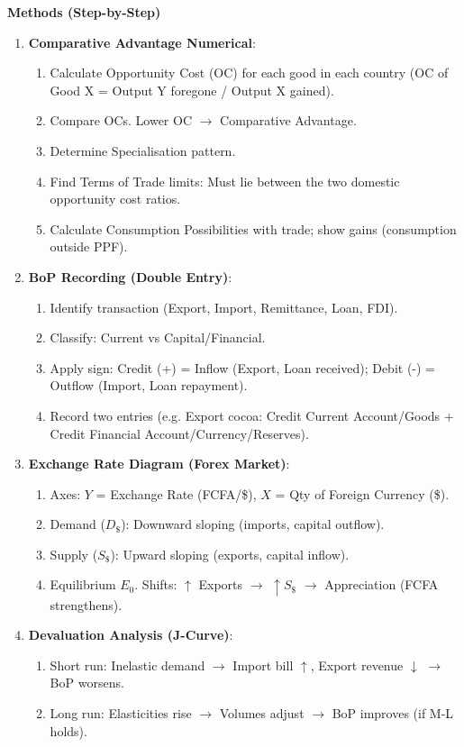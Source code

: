 \documentclass[11pt]{article}
\newcommand{\cle}[1]{{\popxbold\color{popdark}#1}}
\begin{document}
\begin{bilan}
\textbf{Methods (Step-by-Step)}
\begin{enumerate}
    \item \textbf{Comparative Advantage Numerical}: 
    \begin{enumerate}
        \item Calculate Opportunity Cost (OC) for each good in each country (OC of Good X = Output Y foregone / Output X gained).
        \item Compare OCs. Lower OC $\to$ Comparative Advantage.
        \item Determine Specialisation pattern.
        \item Find \cle{Terms of Trade limits}: Must lie between the two domestic opportunity cost ratios.
        \item Calculate Consumption Possibilities with trade; show gains (consumption outside PPF).
    \end{enumerate}
    \item \textbf{BoP Recording (Double Entry)}:
    \begin{enumerate}
        \item Identify transaction (Export, Import, Remittance, Loan, FDI).
        \item Classify: Current vs Capital/Financial.
        \item Apply sign: Credit (+) = Inflow (Export, Loan received); Debit (-) = Outflow (Import, Loan repayment).
        \item Record two entries (e.g. Export cocoa: Credit Current Account/Goods + Credit Financial Account/Currency/Reserves).
    \end{enumerate}
    \item \textbf{Exchange Rate Diagram (Forex Market)}:
    \begin{enumerate}
        \item Axes: $Y$ = Exchange Rate (FCFA/\$), $X$ = Qty of Foreign Currency (\$).
        \item Demand ($D_{\$}$): Downward sloping (imports, capital outflow).
        \item Supply ($S_{\$}$): Upward sloping (exports, capital inflow).
        \item Equilibrium $E_0$. Shifts: $\uparrow$ Exports $\to$ $\uparrow S_{\$}$ $\to$ Appreciation (FCFA strengthens).
    \end{enumerate}
    \item \textbf{Devaluation Analysis (J-Curve)}:
    \begin{enumerate}
        \item Short run: Inelastic demand $\to$ Import bill $\uparrow$, Export revenue $\downarrow$ $\to$ BoP worsens.
        \item Long run: Elasticities rise $\to$ Volumes adjust $\to$ BoP improves (if M-L holds).
    \end{enumerate}
\end{enumerate}


\end{bilan}
\end{document}
